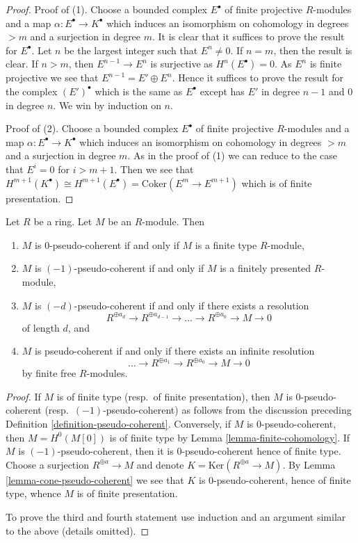 \begin{proof}
Proof of (1). Choose a bounded complex $E^\bullet$ of finite projective
$R$-modules and a map $\alpha : E^\bullet \to K^\bullet$ which induces
an isomorphism on cohomology in degrees $> m$ and a surjection in degree $m$.
It is clear that it suffices to prove the result for $E^\bullet$.
Let $n$ be the largest integer such that $E^n \not = 0$.
If $n = m$, then the result is clear.
If $n > m$, then $E^{n - 1} \to E^n$ is surjective as
$H^n(E^\bullet) = 0$. As $E^n$ is finite projective we see that
$E^{n - 1} = E' \oplus E^n$. Hence it suffices to prove the result
for the complex $(E')^\bullet$ which is the same as $E^\bullet$
except has $E'$ in degree $n - 1$ and $0$ in degree $n$.
We win by induction on $n$.

\medskip\noindent
Proof of (2). Choose a bounded complex $E^\bullet$ of finite projective
$R$-modules and a map $\alpha : E^\bullet \to K^\bullet$ which induces
an isomorphism on cohomology in degrees $> m$ and a surjection in degree $m$.
As in the proof of (1) we can reduce to the case that $E^i = 0$ for
$i > m + 1$. Then we see that
$H^{m + 1}(K^\bullet) \cong
H^{m + 1}(E^\bullet) = \text{Coker}(E^m \to E^{m + 1})$
which is of finite presentation.
\end{proof}

\begin{lemma}
\label{lemma-n-pseudo-module}
Let $R$ be a ring. Let $M$ be an $R$-module.
Then
\begin{enumerate}
\item $M$ is $0$-pseudo-coherent if and only if $M$ is a finite type
$R$-module,
\item $M$ is $(-1)$-pseudo-coherent if and only if $M$ is a finitely
presented $R$-module,
\item $M$ is $(-d)$-pseudo-coherent if and only if there exists a
resolution
$$
R^{\oplus a_d} \to R^{\oplus a_{d - 1}} \to \ldots \to R^{\oplus a_0} \to
M \to 0
$$
of length $d$, and
\item $M$ is pseudo-coherent if and only if there exists an
infinite resolution
$$
\ldots \to R^{\oplus a_1} \to R^{\oplus a_0} \to M \to 0
$$
by finite free $R$-modules.
\end{enumerate}
\end{lemma}

\begin{proof}
If $M$ is of finite type (resp.\ of finite presentation), then $M$
is $0$-pseudo-coherent (resp.\ $(-1)$-pseudo-coherent) as follows from the
discussion preceding
Definition \ref{definition-pseudo-coherent}.
Conversely, if $M$ is $0$-pseudo-coherent, then $M = H^0(M[0])$
is of finite type by
Lemma \ref{lemma-finite-cohomology}.
If $M$ is $(-1)$-pseudo-coherent, then it is $0$-pseudo-coherent hence
of finite type. Choose a surjection $R^{\oplus a} \to M$ and denote
$K = \text{Ker}(R^{\oplus a} \to M)$. By
Lemma \ref{lemma-cone-pseudo-coherent}
we see that $K$ is $0$-pseudo-coherent, hence of finite type, whence
$M$ is of finite presentation.

\medskip\noindent
To prove the third and fourth statement use
induction and an argument similar to the above (details omitted).
\end{proof}

